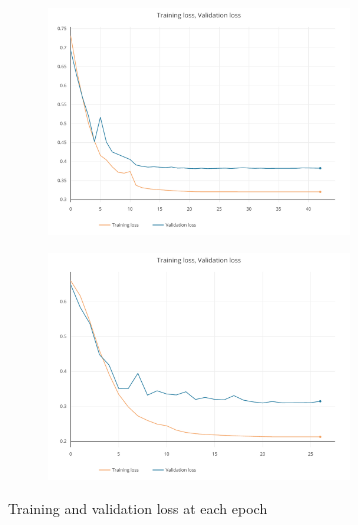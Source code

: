 \documentclass[journal]{IEEEtran}
\begin{document}
\begin{figure}[h]
	\centering

	\begin{subfigure}{0.49\textwidth}
		\centering
		\includegraphics[height = 6cm]{Images/batchlosscurve.pdf}
	\end{subfigure}
	\hspace{1mm}
	\begin{subfigure}{0.49\textwidth}
		\centering
		\includegraphics[height = 6cm]{Images/batchlosscurve1.pdf}
	\end{subfigure}
	
	\caption{Training and validation loss at each epoch}
\end{figure}
\end{document}
